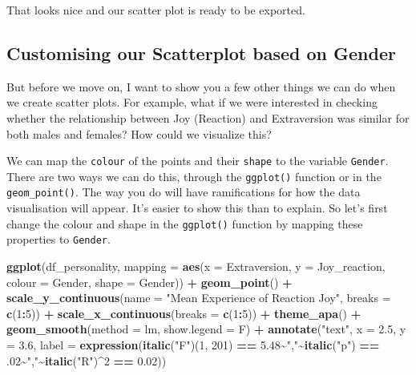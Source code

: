 \documentclass[
]{book}
\newenvironment{Shaded}{\begin{snugshade}}{\end{snugshade}}
\newcommand{\AttributeTok}[1]{\textcolor[rgb]{0.13,0.29,0.53}{#1}}
\newcommand{\DecValTok}[1]{\textcolor[rgb]{0.00,0.00,0.81}{#1}}
\newcommand{\FloatTok}[1]{\textcolor[rgb]{0.00,0.00,0.81}{#1}}
\newcommand{\FunctionTok}[1]{\textcolor[rgb]{0.13,0.29,0.53}{\textbf{#1}}}
\newcommand{\NormalTok}[1]{#1}
\newcommand{\SpecialCharTok}[1]{\textcolor[rgb]{0.81,0.36,0.00}{\textbf{#1}}}
\newcommand{\StringTok}[1]{\textcolor[rgb]{0.31,0.60,0.02}{#1}}
\begin{document}
That looks nice and our scatter plot is ready to be exported.

\hypertarget{customising-our-scatterplot-based-on-gender}{%
\subsection{Customising our Scatterplot based on Gender}\label{customising-our-scatterplot-based-on-gender}}

But before we move on, I want to show you a few other things we can do when we create scatter plots. For example, what if we were interested in checking whether the relationship between Joy (Reaction) and Extraversion was similar for both males and females? How could we visualize this?

We can map the \texttt{colour} of the points and their \texttt{shape} to the variable \texttt{Gender}. There are two ways we can do this, through the \texttt{ggplot()} function or in the \texttt{geom\_point()}. The way you do will have ramifications for how the data visualisation will appear. It's easier to show this than to explain. So let's first change the colour and shape in the \texttt{ggplot()} function by mapping these properties to \texttt{Gender}.

\begin{Shaded}
\begin{Highlighting}[]
\FunctionTok{ggplot}\NormalTok{(df\_personality, }\AttributeTok{mapping =} \FunctionTok{aes}\NormalTok{(}\AttributeTok{x =}\NormalTok{ Extraversion, }\AttributeTok{y =}\NormalTok{ Joy\_reaction, }\AttributeTok{colour =}\NormalTok{ Gender, }\AttributeTok{shape =}\NormalTok{ Gender)) }\SpecialCharTok{+}
  \FunctionTok{geom\_point}\NormalTok{() }\SpecialCharTok{+}
  \FunctionTok{scale\_y\_continuous}\NormalTok{(}\AttributeTok{name =} \StringTok{"Mean Experience of Reaction Joy"}\NormalTok{, }\AttributeTok{breaks =} \FunctionTok{c}\NormalTok{(}\DecValTok{1}\SpecialCharTok{:}\DecValTok{5}\NormalTok{)) }\SpecialCharTok{+}
  \FunctionTok{scale\_x\_continuous}\NormalTok{(}\AttributeTok{breaks =} \FunctionTok{c}\NormalTok{(}\DecValTok{1}\SpecialCharTok{:}\DecValTok{5}\NormalTok{)) }\SpecialCharTok{+}
  \FunctionTok{theme\_apa}\NormalTok{() }\SpecialCharTok{+}
  \FunctionTok{geom\_smooth}\NormalTok{(}\AttributeTok{method =}\NormalTok{ lm, }\AttributeTok{show.legend =}\NormalTok{ F) }\SpecialCharTok{+}
  \FunctionTok{annotate}\NormalTok{(}\StringTok{"text"}\NormalTok{, }\AttributeTok{x =} \FloatTok{2.5}\NormalTok{, }\AttributeTok{y =} \FloatTok{3.6}\NormalTok{,}
           \AttributeTok{label =} \FunctionTok{expression}\NormalTok{(}\FunctionTok{italic}\NormalTok{(}\StringTok{"F"}\NormalTok{)(}\DecValTok{1}\NormalTok{, }\DecValTok{201}\NormalTok{) }\SpecialCharTok{==} \FloatTok{5.48}\SpecialCharTok{\textasciitilde{}}\StringTok{","}\SpecialCharTok{\textasciitilde{}}\FunctionTok{italic}\NormalTok{(}\StringTok{"p"}\NormalTok{) }\SpecialCharTok{==}\NormalTok{ .}\DecValTok{02}\SpecialCharTok{\textasciitilde{}}\StringTok{","}\SpecialCharTok{\textasciitilde{}}\FunctionTok{italic}\NormalTok{(}\StringTok{"R"}\NormalTok{)}\SpecialCharTok{\^{}}\DecValTok{2} \SpecialCharTok{==} \FloatTok{0.02}\NormalTok{))}
\end{Highlighting}
\end{Shaded}
\end{document}
